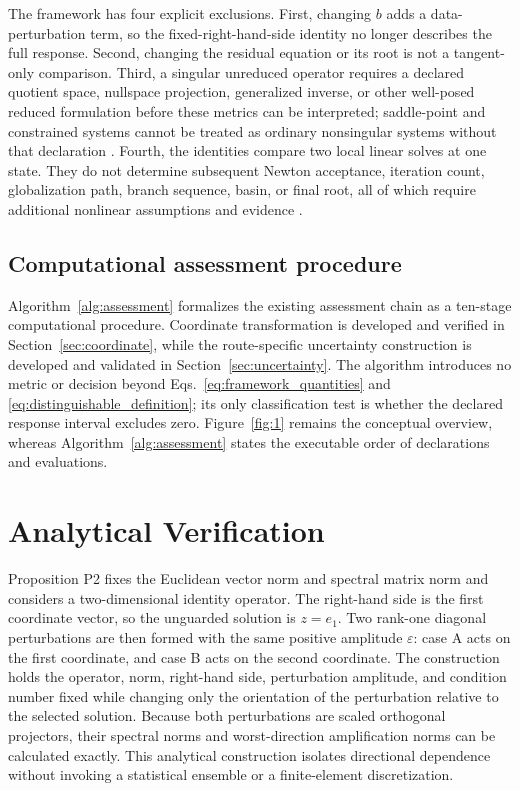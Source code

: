 \documentclass[preprint,12pt]{elsarticle}
\begin{document}
The framework has four explicit exclusions. First, changing $b$ adds a data-perturbation term, so the fixed-right-hand-side identity no longer describes the full response. Second, changing the residual equation or its root is not a tangent-only comparison. Third, a singular unreduced operator requires a declared quotient space, nullspace projection, generalized inverse, or other well-posed reduced formulation before these metrics can be interpreted; saddle-point and constrained systems cannot be treated as ordinary nonsingular systems without that declaration \cite{S17,S20}. Fourth, the identities compare two local linear solves at one state. They do not determine subsequent Newton acceptance, iteration count, globalization path, branch sequence, basin, or final root, all of which require additional nonlinear assumptions and evidence \cite{S21,S23}.

\subsection{Computational assessment procedure}

Algorithm~\ref{alg:assessment} formalizes the existing assessment chain as a ten-stage computational procedure. Coordinate transformation is developed and verified in Section~\ref{sec:coordinate}, while the route-specific uncertainty construction is developed and validated in Section~\ref{sec:uncertainty}. The algorithm introduces no metric or decision beyond Eqs.~\eqref{eq:framework_quantities} and \eqref{eq:distinguishable_definition}; its only classification test is whether the declared response interval excludes zero. Figure~\ref{fig:1} remains the conceptual overview, whereas Algorithm~\ref{alg:assessment} states the executable order of declarations and evaluations.



\FloatBarrier
\section{Analytical Verification}

Proposition P2 fixes the Euclidean vector norm and spectral matrix norm and considers a two-dimensional identity operator. The right-hand side is the first coordinate vector, so the unguarded solution is $z = e_1$. Two rank-one diagonal perturbations are then formed with the same positive amplitude $\varepsilon$: case A acts on the first coordinate, and case B acts on the second coordinate. The construction holds the operator, norm, right-hand side, perturbation amplitude, and condition number fixed while changing only the orientation of the perturbation relative to the selected solution. Because both perturbations are scaled orthogonal projectors, their spectral norms and worst-direction amplification norms can be calculated exactly. This analytical construction isolates directional dependence without invoking a statistical ensemble or a finite-element discretization.
\end{document}
